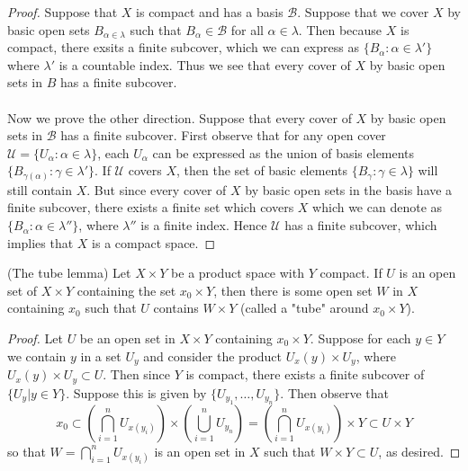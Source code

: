 \documentclass[a4paper,12pt,twoside]{hmcpset}
\begin{document}
\begin{proof}
    Suppose that $X$ is compact and has a basis $\mathcal{B}$. Suppose
    that we cover $X$ by basic open sets $B_{\alpha \in \lambda}$ such
    that $B_\alpha \in \mathcal{B}$ for all $\alpha \in \lambda$. Then
    because $X$ is compact, there exsits a finite subcover, which we
    can express as $\{B_{\alpha} : \alpha \in \lambda'\}$ where
    $\lambda'$ is a countable index. Thus we see that every cover of
    $X$ by basic open sets in $B$ has a finite subcover. \\
    \\
    Now we prove the other direction. Suppose that every cover of $X$
    by basic open sets in $\mathcal{B}$ has a finite subcover. First
    observe that for any open cover $\mathcal{U} = \{U_\alpha : \alpha
    \in \lambda\}$, each $U_\alpha$ can be expressed as the union of
    basis elements $\{B_{\gamma(\alpha)} : \gamma \in \lambda'\}$. If
    $\mathcal{U}$ covers $X$, then the set of basic elements
    $\{B_\gamma : \gamma \in \lambda\}$ will still contain $X$. But
    since every cover of $X$ by basic open sets in the basis have a
    finite subcover, there exists a finite set which covers $X$ which
    we can denote as $\{B_\alpha : \alpha \in \lambda''\}$, where
    $\lambda''$ is a finite index. Hence $\mathcal{U}$ has a finite
    subcover, which implies that $X$ is a compact space. 
\end{proof}

\begin{problem}[Theorem 7.18] (The tube lemma) Let $X \times Y$ be a
    product space with $Y$ compact. If $U$ is an open set of $X \times
    Y$ containing the set $x_0 \times Y$, then there is some open set
    $W$ in $X$ containing $x_0$ such that $U$ contains $W \times Y$
    (called a "tube" around $x_0 \times Y$).
\end{problem}

\begin{proof}
    Let $U$ be an open set in $X \times Y$ containing $x_0 \times Y$.
    Suppose for each $y \in Y$ we contain $y$ in a set $U_y$ and
    consider the product $U_x(y) \times U_y$, where $U_x(y) \times U_y
    \subset U$. Then since $Y$ is compact, there exists a finite
    subcover of $\{U_y | y \in Y\}$. Suppose this is given by
    $\{U_{y_1}, \dots, U_{y_n} \}$. Then observe that 
    $$x_0 \subset \left(\bigcap_{i = 1}^nU_{x(y_i)}\right) \times
    \left(\bigcup_{i = 1}^n U_{y_n}\right) = \left(\bigcap_{i =
    1}^nU_{x(y_i)}\right) \times Y \subset U \times Y$$ so that $W =
    \bigcap_{i = 1}^nU_{x(y_i)}$ is an open set in $X$ such that $W
    \times Y \subset U$, as desired.
\end{proof}
\end{document}
